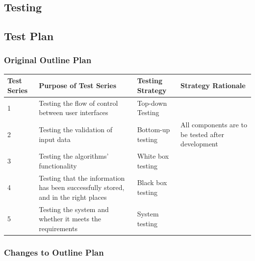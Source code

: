 \begin{landscape}

\chapter{Testing}

\section{Test Plan}

\subsection{Original Outline Plan}

\begin{center}
    \begin{tabular}{|p{2cm}|p{5cm}|p{5cm}|p{4cm}|}
        \hline
        \textbf{Test Series} & \textbf{Purpose of Test Series} & \textbf{Testing Strategy} & \textbf{Strategy Rationale}\\ \hline
        1 & Testing the flow of control between user interfaces & Top-down Testing & \\ \hline
        2 & Testing the validation of input data & Bottom-up testing & All components are to be tested after development \\ \hline
        3 & Testing the algorithms' functionality & White box testing & \\ \hline
        4 & Testing that the information has been successfully stored, and in the right places & Black box testing & \\ \hline
        5 & Testing the system and whether it meets the requirements & System testing & \\ \hline
    \end{tabular}
\end{center}


\subsection{Changes to Outline Plan}


\end{landscape}
